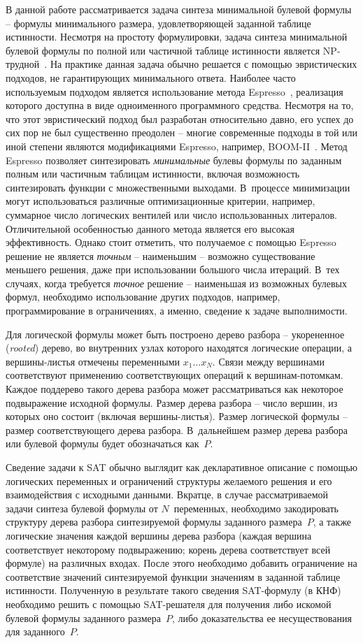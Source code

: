 В данной работе рассматривается задача синтеза минимальной булевой формулы \--- формулы минимального размера, удовлетворяющей заданной таблице истинности.
Несмотря на простоту формулировки, задача синтеза минимальной булевой формулы по полной или частичной таблице истинности является NP-трудной~\cite{akshay2018}.
На практике данная задача обычно решается с помощью эвристических подходов, не гарантирующих минимального ответа.
Наиболее часто используемым подходом является использование метода Espresso~\cite{brayton1984}, реализация которого доступна в виде одноименного программного средства.
Несмотря на то, что этот эвристический подход был разработан относительно давно, его успех до сих пор не был существенно преодолен \--- многие современные подходы в той или иной степени являются модификациями Espresso, например, BOOM-II~\cite{fiser2006}.
Метод Espresso позволяет синтезировать \emph{минимальные} булевы формулы по заданным полным или частичным таблицам истинности, включая возможность синтезировать функции с множественными выходами.
В~процессе минимизации могут использоваться различные оптимизационные критерии, например, суммарное число логических вентилей или число использованных литералов.
Отличительной особенностью данного метода является его высокая эффективность.
Однако стоит отметить, что получаемое с помощью Espresso решение не является \emph{точным} \--- наименьшим \--- возможно существование меньшего решения, даже при использовании большого числа итераций.
В~тех случаях, когда требуется \emph{точное} решение \--- наименьшая из возможных булевых формул, необходимо использование других подходов, например, программирование в ограничениях, а именно, сведение к задаче выполнимости.

Для логической формулы может быть построено дерево разбора \--- укорененное (\textit{rooted}) дерево, во внутренних узлах которого находятся логические операции, а вершины-листья отмечены переменными $x_{1} \ldots x_{N}$.
Связи между вершинами соответствуют применению соответствующих операций к вершинам-потомкам.
Каждое поддерево такого дерева разбора может рассматриваться как некоторое подвыражение исходной формулы.
Размер дерева разбора \--- число вершин, из которых оно состоит (включая вершины-листья).
Размер логической формулы \--- размер соответствующего дерева разбора.
В~дальнейшем размер дерева разбора или булевой формулы будет обозначаться как~$P$.

Сведение задачи к SAT обычно выглядит как декларативное описание с помощью логических переменных и ограничений структуры желаемого решения и его взаимодействия с исходными данными.
Вкратце, в случае рассматриваемой задачи синтеза булевой формулы от $N$~переменных, необходимо закодировать структуру дерева разбора синтезируемой формулы заданного размера~$P$, а также логические значения каждой вершины дерева разбора (каждая вершина соответствует некоторому подвыражению; корень дерева соответствует всей формуле) на различных входах.
После этого необходимо добавить ограничение на соответствие значений синтезируемой функции значениям в заданной таблице истинности.
Полученную в результате такого сведения SAT-формулу (в КНФ) необходимо решить с помощью SAT-решателя для получения либо искомой булевой формулы заданного размера~$P$, либо доказательства ее несуществования для заданного~$P$.

